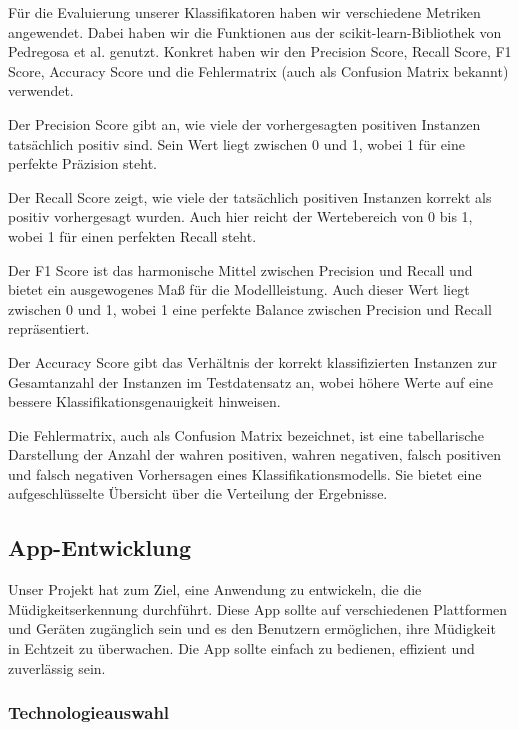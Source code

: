 Für die Evaluierung unserer Klassifikatoren haben wir verschiedene Metriken angewendet. Dabei haben wir die Funktionen aus der scikit-learn-Bibliothek von Pedregosa et al. \cite{PE11} genutzt. Konkret haben wir den Precision Score, Recall Score, F1 Score, Accuracy Score und die Fehlermatrix (auch als Confusion Matrix bekannt) verwendet.

Der Precision Score gibt an, wie viele der vorhergesagten positiven Instanzen tatsächlich positiv sind. Sein Wert liegt zwischen 0 und 1, wobei 1 für eine perfekte Präzision steht.

Der Recall Score zeigt, wie viele der tatsächlich positiven Instanzen korrekt als positiv vorhergesagt wurden. Auch hier reicht der Wertebereich von 0 bis 1, wobei 1 für einen perfekten Recall steht.

Der F1 Score ist das harmonische Mittel zwischen Precision und Recall und bietet ein ausgewogenes Maß für die Modellleistung. Auch dieser Wert liegt zwischen 0 und 1, wobei 1 eine perfekte Balance zwischen Precision und Recall repräsentiert.

Der Accuracy Score gibt das Verhältnis der korrekt klassifizierten Instanzen zur Gesamtanzahl der Instanzen im Testdatensatz an, wobei höhere Werte auf eine bessere Klassifikationsgenauigkeit hinweisen.

Die Fehlermatrix, auch als Confusion Matrix bezeichnet, ist eine tabellarische Darstellung der Anzahl der wahren positiven, wahren negativen, falsch positiven und falsch negativen Vorhersagen eines Klassifikationsmodells. Sie bietet eine aufgeschlüsselte Übersicht über die Verteilung der Ergebnisse.

\subsection{App-Entwicklung}
\label{ssec:appEntwicklung}
	Unser Projekt hat zum Ziel, eine Anwendung zu entwickeln, die die Müdigkeitserkennung durchführt. Diese App sollte auf verschiedenen Plattformen und Geräten zugänglich sein und es den Benutzern ermöglichen, ihre Müdigkeit in Echtzeit zu überwachen. Die App sollte einfach zu bedienen, effizient und zuverlässig sein. 
	
	\subsubsection{Technologieauswahl}
	\label{sssec:technologie}
		
